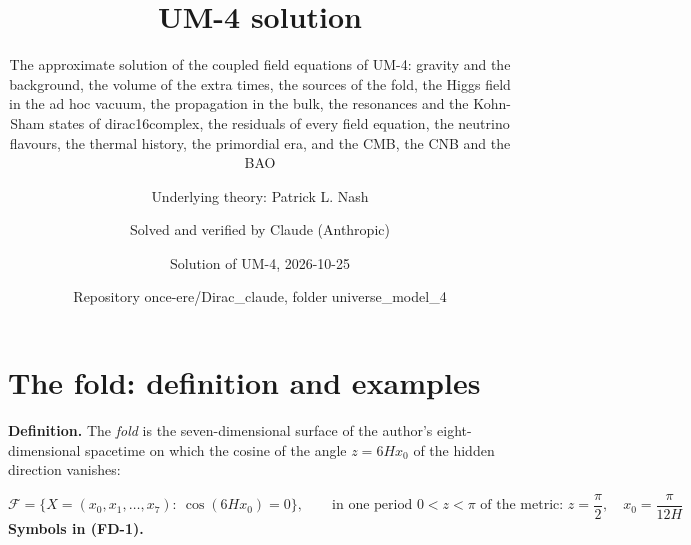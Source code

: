 \documentclass[
  10pt,
]{article}
\title{UM-4 solution}
\subtitle{The approximate solution of the coupled field equations of
UM-4: gravity and the background, the volume of the extra times, the
sources of the fold, the Higgs field in the ad hoc vacuum, the
propagation in the bulk, the resonances and the Kohn-Sham states of
dirac16complex, the residuals of every field equation, the neutrino
flavours, the thermal history, the primordial era, and the CMB, the CNB
and the BAO}
\author{Underlying theory: Patrick L. Nash \and Solved and verified by
Claude (Anthropic) \and Solution of UM-4, 2026-10-25 \and Repository
once-ere/Dirac\_claude, folder universe\_model\_4}
\date{}
\begin{document}
\maketitle

{
\hypersetup{linkcolor=}
\setcounter{tocdepth}{3}
\tableofcontents
}
\hypertarget{the-fold-definition-and-examples}{%
\section{The fold: definition and
examples}\label{the-fold-definition-and-examples}}

\textbf{Definition.} The \emph{fold} is the seven-dimensional surface of
the author's eight-dimensional spacetime on which the cosine of the
angle \(z = 6Hx_0\) of the hidden direction vanishes:

\[
\mathcal{F} = \big\{X = (x_0, x_1, \dots, x_7):\ \cos(6Hx_0) = 0\big\},\qquad
\text{in one period } 0 < z < \pi\text{ of the metric: } z = \frac{\pi}{2},\quad x_0 = \frac{\pi}{12H} \tag{FD-1}
\] \textbf{Symbols in (FD-1).}
\end{document}
